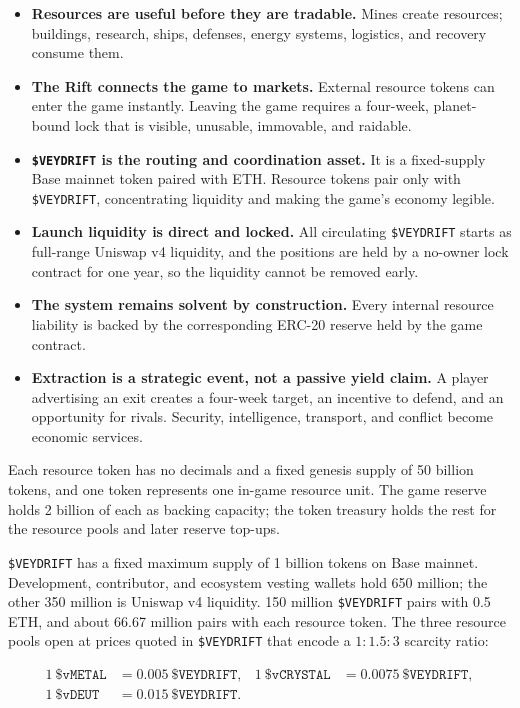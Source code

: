 \documentclass[11pt]{article}
\newcommand{\token}[1]{\texttt{\$#1}}
\begin{document}
\begin{itemize}
  \item \textbf{Resources are useful before they are tradable.} Mines create resources; buildings, research, ships, defenses, energy systems, logistics, and recovery consume them.
  \item \textbf{The Rift connects the game to markets.} External resource tokens can enter the game instantly. Leaving the game requires a four-week, planet-bound lock that is visible, unusable, immovable, and raidable.
  \item \textbf{\token{VEYDRIFT} is the routing and coordination asset.} It is a fixed-supply Base mainnet token paired with ETH. Resource tokens pair only with \token{VEYDRIFT}, concentrating liquidity and making the game's economy legible.
  \item \textbf{Launch liquidity is direct and locked.} All circulating \token{VEYDRIFT} starts as full-range Uniswap v4 liquidity, and the positions are held by a no-owner lock contract for one year, so the liquidity cannot be removed early.
  \item \textbf{The system remains solvent by construction.} Every internal resource liability is backed by the corresponding ERC-20 reserve held by the game contract.
  \item \textbf{Extraction is a strategic event, not a passive yield claim.} A player advertising an exit creates a four-week target, an incentive to defend, and an opportunity for rivals. Security, intelligence, transport, and conflict become economic services.
\end{itemize}

Each resource token has no decimals and a fixed genesis supply of 50 billion tokens, and one token represents one in-game resource unit. The game reserve holds 2 billion of each as backing capacity; the token treasury holds the rest for the resource pools and later reserve top-ups.

\token{VEYDRIFT} has a fixed maximum supply of 1 billion tokens on Base mainnet. Development, contributor, and ecosystem vesting wallets hold 650 million; the other 350 million is Uniswap v4 liquidity. 150 million \token{VEYDRIFT} pairs with 0.5 ETH, and about 66.67 million pairs with each resource token. The three resource pools open at prices quoted in \token{VEYDRIFT} that encode a $1:1.5:3$ scarcity ratio:

\begin{align*}
1\ \token{vMETAL} &= 0.005\ \token{VEYDRIFT}, &
1\ \token{vCRYSTAL} &= 0.0075\ \token{VEYDRIFT},\\
1\ \token{vDEUT} &= 0.015\ \token{VEYDRIFT}. &&
\end{align*}
\end{document}
